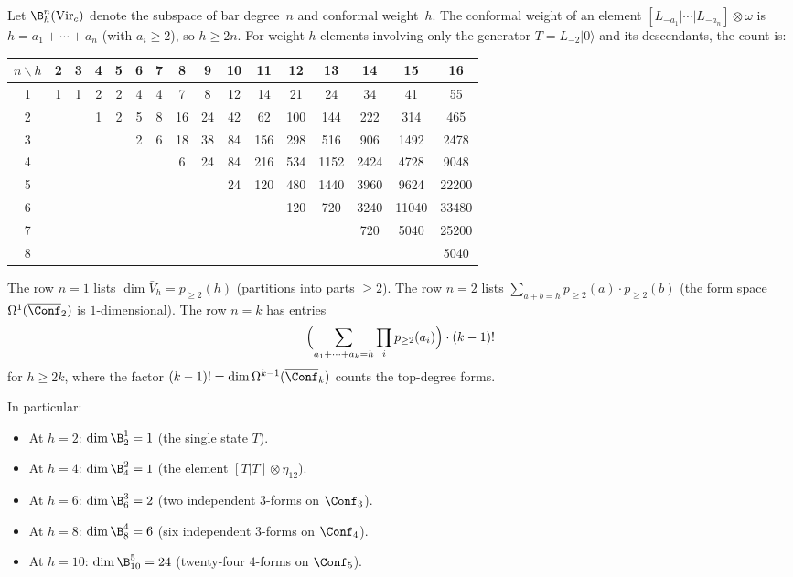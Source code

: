 \begin{computation}
\label{comp:virasoro-dim-table}
Let $\B^n_h(\mathrm{Vir}_c)$ denote the subspace of bar degree~$n$
and conformal weight~$h$. The conformal weight of an element
$[L_{-a_1}| \cdots |L_{-a_n}] \otimes \omega$ is
$h = a_1 + \cdots + a_n$ (with $a_i \geq 2$), so
$h \geq 2n$. For weight-$h$ elements involving only the
generator $T = L_{-2}|0\rangle$ and its descendants, the count is:
\begin{center}
\renewcommand{\arraystretch}{1.15}
{\small
\begin{tabular}{c|ccccccccccccccc}
$n \backslash h$ & 2 & 3 & 4 & 5 & 6 & 7 & 8 & 9 & 10 & 11 & 12 & 13 & 14 & 15 & 16 \\
\hline
1 & 1 & 1 & 2 & 2 & 4 & 4 & 7 & 8 & 12 & 14 & 21 & 24 & 34 & 41 & 55 \\
2 & & & 1 & 2 & 5 & 8 & 16 & 24 & 42 & 62 & 100 & 144 & 222 & 314 & 465 \\
3 & & & & & 2 & 6 & 18 & 38 & 84 & 156 & 298 & 516 & 906 & 1492 & 2478 \\
4 & & & & & & & 6 & 24 & 84 & 216 & 534 & 1152 & 2424 & 4728 & 9048 \\
5 & & & & & & & & & 24 & 120 & 480 & 1440 & 3960 & 9624 & 22200 \\
6 & & & & & & & & & & & 120 & 720 & 3240 & 11040 & 33480 \\
7 & & & & & & & & & & & & & 720 & 5040 & 25200 \\
8 & & & & & & & & & & & & & & & 5040
\end{tabular}
}
\end{center}
The row $n = 1$ lists $\dim \bar{V}_h = p_{\geq 2}(h)$
(partitions into parts $\geq 2$). The row $n = 2$ lists
$\sum_{a+b=h} p_{\geq 2}(a) \cdot p_{\geq 2}(b)$
(the form space $\Omega^1(\overline{\Conf}_2)$ is
$1$-dimensional).
The row $n = k$ has entries
\[
\Bigl(\sum_{a_1 + \cdots + a_k = h}
\prod_i p_{\geq 2}(a_i)\Bigr) \cdot (k-1)!
\]
for $h \geq 2k$, where the factor
$(k-1)! = \dim \Omega^{k-1}(\overline{\Conf}_k)$
counts the top-degree forms.

In particular:
\begin{itemize}
\item At $h = 2$: $\dim \B^1_2 = 1$ (the single state $T$).
\item At $h = 4$: $\dim \B^2_4 = 1$ (the element $[T|T] \otimes \eta_{12}$).
\item At $h = 6$: $\dim \B^3_6 = 2$ (two independent $3$-forms on $\Conf_3$).
\item At $h = 8$: $\dim \B^4_8 = 6$ (six independent $3$-forms on $\Conf_4$).
\item At $h = 10$: $\dim \B^5_{10} = 24$ (twenty-four $4$-forms on $\Conf_5$).
\end{itemize}
\end{computation}

